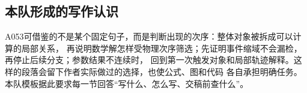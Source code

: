 \subsection{本队形成的写作认识}

A053可借鉴的不是某个固定句子，而是判断出现的次序：整体对象被拆成可以计算的局部关系，
再说明数学解怎样受物理次序筛选；先证明事件缩域不会漏检，再停止后续分支；参数结果不连续时，
回到第一次触发对象和局部轨迹解释。这样的段落会留下作者实际做过的选择，也使公式、图和代码
各自承担明确任务。本队模板据此要求每一节回答“写什么、怎么写、交稿前查什么”。

